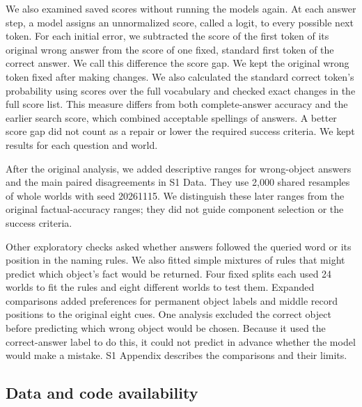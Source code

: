 \documentclass[10pt,letterpaper]{article}
\begin{document}
We also examined saved scores without running the models again. At each answer step, a model assigns an unnormalized score, called a logit, to every possible next token. For each initial error, we subtracted the score of the first token of its original wrong answer from the score of one fixed, standard first token of the correct answer. We call this difference the score gap. We kept the original wrong token fixed after making changes. We also calculated the standard correct token's probability using scores over the full vocabulary and checked exact changes in the full score list. This measure differs from both complete-answer accuracy and the earlier search score, which combined acceptable spellings of answers. A better score gap did not count as a repair or lower the required success criteria. We kept results for each question and world.


After the original analysis, we added descriptive ranges for wrong-object answers and the main paired disagreements in S1 Data. They use 2,000 shared resamples of whole worlds with seed 20261115. We distinguish these later ranges from the original factual-accuracy ranges; they did not guide component selection or the success criteria.


Other exploratory checks asked whether answers followed the queried word or its position in the naming rules. We also fitted simple mixtures of rules that might predict which object's fact would be returned. Four fixed splits each used 24 worlds to fit the rules and eight different worlds to test them. Expanded comparisons added preferences for permanent object labels and middle record positions to the original eight cues. One analysis excluded the correct object before predicting which wrong object would be chosen. Because it used the correct-answer label to do this, it could not predict in advance whether the model would make a mistake. S1 Appendix describes the comparisons and their limits.


\subsection*{Data and code availability}
\end{document}
